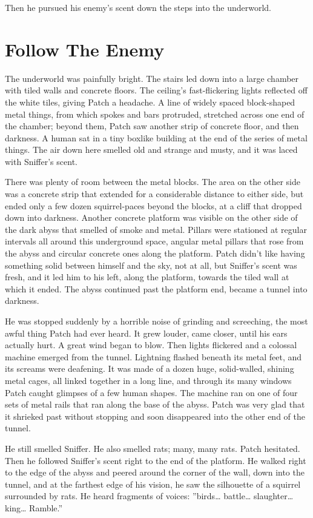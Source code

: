 \documentclass[12pt]{book}
\begin{document}
Then he pursued his enemy's scent down the steps into the underworld.


\section{Follow The Enemy}

The underworld was painfully bright. The stairs led down into a large chamber with tiled walls and concrete floors. The ceiling's fast-flickering lights reflected off the white tiles, giving Patch a headache. A line of widely spaced block-shaped metal things, from which spokes and bars protruded, stretched across one end of the chamber; beyond them, Patch saw another strip of concrete floor, and then darkness. A human sat in a tiny boxlike building at the end of the series of metal things. The air down here smelled old and strange and musty, and it was laced with Sniffer's scent.

There was plenty of room between the metal blocks. The area on the other side was a concrete strip that extended for a considerable distance to either side, but ended only a few dozen squirrel-paces beyond the blocks, at a cliff that dropped down into darkness. Another concrete platform was visible on the other side of the dark abyss that smelled of smoke and metal. Pillars were stationed at regular intervals all around this underground space, angular metal pillars that rose from the abyss and circular concrete ones along the platform. Patch didn't like having something solid between himself and the sky, not at all, but Sniffer's scent was fresh, and it led him to his left, along the platform, towards the tiled wall at which it ended. The abyss continued past the platform end, became a tunnel into darkness.

He was stopped suddenly by a horrible noise of grinding and screeching, the most awful thing Patch had ever heard. It grew louder, came closer, until his ears actually hurt. A great wind began to blow. Then lights flickered and a colossal machine emerged from the tunnel. Lightning flashed beneath its metal feet, and its screams were deafening. It was made of a dozen huge, solid-walled, shining metal cages, all linked together in a long line, and through its many windows Patch caught glimpses of a few human shapes. The machine ran on one of four sets of metal rails that ran along the base of the abyss. Patch was very glad that it shrieked past without stopping and soon disappeared into the other end of the tunnel.

He still smelled Sniffer. He also smelled rats; many, many rats. Patch hesitated. Then he followed Sniffer's scent right to the end of the platform. He walked right to the edge of the abyss and peered around the corner of the wall, down into the tunnel, and at the farthest edge of his vision, he saw the silhouette of a squirrel surrounded by rats. He heard fragments of voices: ''birds\ldots{}
battle\ldots{}
slaughter\ldots{}
king\ldots{}
Ramble.''
\end{document}

